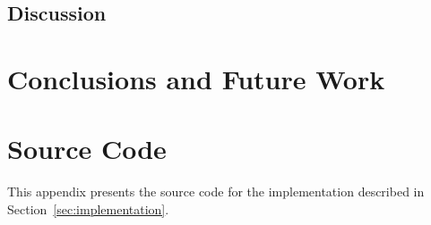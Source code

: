 \documentclass[a4paper,11pt]{article}
\newcommand{\Chapref}[1]{Section~\ref{#1}}
\numberwithin{equation}{section}
\begin{document}
\subsection{Discussion}
\label{evaluation:discussion}



\section{Conclusions and Future Work}
\label{conclusions}




\appendix
\section{Source Code}
\label{sec:source-code}


This appendix presents the source code for the implementation described in \Chapref{sec:implementation}.
\end{document}
